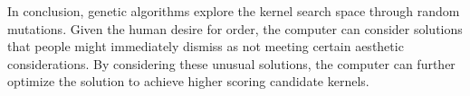 \documentclass[preprint,12pt,3p]{elsarticle}
\begin{document}
In conclusion, genetic algorithms explore the kernel search space through random mutations. Given the human desire for order, the computer can consider solutions that people might immediately dismiss as not meeting certain aesthetic considerations. By considering these unusual solutions, the computer can further optimize the solution to achieve higher scoring candidate kernels. 








\end{document}
